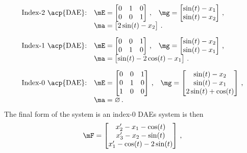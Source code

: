 \begin{equation*}
  \begin{array}{l}
    \text{Index-2 \acp{DAE}:} \quad \mE = \begin{bmatrix}
      0 & 1 & 0 \\
      0 & 0 & 1
    \end{bmatrix} \, \text{,} \quad
    \mg = \begin{bmatrix}
      \sin(t) - x_{1} \\
      \sin(t) - x_{2}
    \end{bmatrix} \, \text{,} \\[0.5em]
    \phantom{\text{Index-2 \acp{DAE}:}} \quad \ma = \begin{bmatrix}
      2\sin(t) - x_{2}
    \end{bmatrix} \, \text{.} \\[1.0em]
    \text{Index-1 \acp{DAE}:} \quad \mE = \begin{bmatrix}
      0 & 0 & 1 \\
      0 & 1 & 0
    \end{bmatrix} \, \text{,} \quad
    \mg = \begin{bmatrix}
      \sin(t) - x_{2} \\
      \sin(t) - x_{1}
    \end{bmatrix} \, \text{,} \\[0.5em]
    \phantom{\text{Index-1 \acp{DAE}:}} \quad \ma = \begin{bmatrix}
      \sin(t) - 2\cos(t) - x_{1}
    \end{bmatrix} \, \text{.} \\[1.0em]
    \text{Index-0 \acp{DAE}:} \quad \mE = \begin{bmatrix}
      0 & 0 & 1 \\
      0 & 1 & 0 \\
      1 & 0 & 0
    \end{bmatrix} \, \text{,} \quad
    \mg = \begin{bmatrix}
      \sin(t) - x_{2} \\
      \sin(t) - x_{1} \\
      2\sin(t) + \cos(t)
    \end{bmatrix} \, \text{,} \\[0.5em]
    \phantom{\text{Index-0 \acp{DAE}:}} \quad \ma = \varnothing \, \text{.}
  \end{array}
\end{equation*}
%
The final form of the system is an index-0 \acp{DAE} system is then
%
\begin{equation*}
  \mF = \begin{bmatrix}
    x^{\prime}_{2} - x_{1} - \cos(t) \\
    x^{\prime}_{3} - x_{2} - \sin(t) \\
    x^{\prime}_{1} - \cos(t) - 2\sin(t)
  \end{bmatrix} \, \text{,}
\end{equation*}
